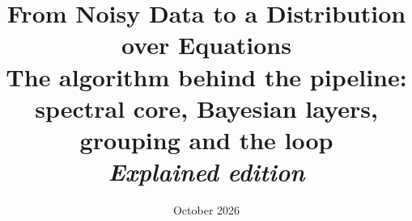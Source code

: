 

\title{\textbf{From Noisy Data to a Distribution over Equations}\\[4pt]
\large The algorithm behind the pipeline: spectral core, Bayesian layers, grouping and the loop\\[2pt]\normalsize\textit{Explained edition}}
\author{}
\date{October 2026}

\let\oldsection\section\renewcommand{\section}{\Needspace{9\baselineskip}\oldsection}
\let\oldsubsection\subsection\renewcommand{\subsection}{\Needspace{7\baselineskip}\oldsubsection}

\maketitle

